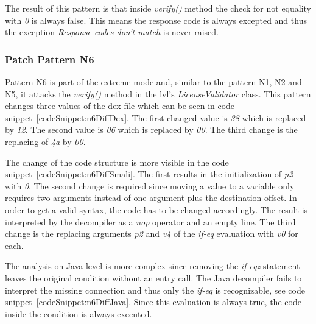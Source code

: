 The result of this pattern is that inside \textit{verify()} method the check for not equality with \textit{0} is always false.
This means the response code is always excepted and thus the exception \textit{Response codes don't match} is never raised.

\subsubsection{Patch Pattern N6}
Pattern N6 is part of the extreme mode and, similar to the pattern N1, N2 and N5, it attacks the \textit{verify()} method in the \gls{lvl}'s \textit{LicenseValidator} class.
\newline
This pattern changes three values of the \gls{dex} file which can be seen in code snippet~\ref{codeSnippet:n6DiffDex}.
The first changed value is \textit{38} which is replaced by \textit{12}.
The second value is \textit{06} which is replaced by \textit{00}.
The third change is the replacing of \textit{4a} by \textit{00}.
\newline

The change of the code structure is more visible in the code snippet~\ref{codeSnippet:n6DiffSmali}.
The first results in the initialization of \textit{p2} with \textit{0}.
The second change is required since moving a value to a variable only requires two arguments instead of one argument plus the destination offset.
In order to get a valid syntax, the code has to be changed accordingly.
The result is interpreted by the decompiler as a \textit{nop} operator and an empty line.
The third change is the replacing arguments \textit{p2} and \textit{v4} of the \textit{if-eq} evaluation with \textit{v0} for each.
\newline


The analysis on Java level is more complex since removing the \textit{if-eqz} statement leaves the original condition without an entry call.
The Java decompiler fails to interpret the missing connection and thus only the \textit{if-eq} is recognizable, see code snippet~\ref{codeSnippet:n6DiffJava}.
Since this evaluation is always true, the code inside the condition is always executed.
\newline


